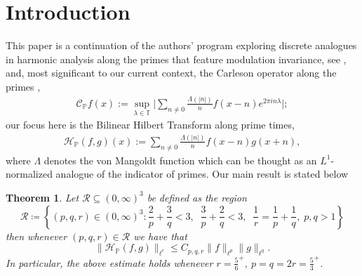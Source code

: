 \documentclass[12pt,leqno]{amsart}
\numberwithin{equation}{section}
\newtheorem{theorem}[equation]{Theorem}
\theoremstyle{definition}
\theoremstyle{plain}
\begin{document}
	\maketitle
	
	\setcounter{footnote}{0} %
	
	
	\setcounter{tocdepth}{1}
	
	\section{Introduction}
	
	This paper is a continuation of the authors' program exploring discrete analogues in harmonic analysis along the primes that feature modulation invariance, see \cite{F+,FKT1}, and, most significant to our current context, the Carleson operator along the primes \cite{FKMS26},
	\begin{align}
		\mathcal{C}_{\mathbb{P}}f(x) := \sup_{\lambda \in \mathbb{T}} \big| \sum_{n \neq 0} \frac{\Lambda(|n|)}{n} f(x-n) e^{2 \pi i n \lambda} \big|;
	\end{align}
	our focus here is the Bilinear Hilbert Transform along prime times,
	\begin{align}\label{e:BHTdef}
		\mathcal{H}_{\mathbb{P}}(f,g)(x) := \sum_{n \neq 0} \frac{\Lambda(|n|)}{n} f(x-n) g(x+n),
	\end{align}
	where $\Lambda$ denotes the von Mangoldt function which can be thought as an $L^1$-normalized analogue of the indicator of primes. Our main result is stated below
	\begin{theorem} \label{t:maintheorem}
		Let $\mathcal{R} \subseteq (0,\infty)^{3}$ be defined as the region  \[  \mathcal{R} \coloneqq  \left\{ (p,q,r) \in (0,\infty)^3: \frac{2}{p}+\frac{3}{q}<3,\; \; \frac{3}{p}+\frac{2}{q}<3, \;\; \frac{1}{r}=\frac{1}{p}+\frac{1}{q}, \; p,q>1  \right\} \] then whenever $(p,q,r) \in \mathcal{R}$ we have that
		\[ \| \mathcal{H}_{\mathbb{P}}(f,g) \|_{\ell^r} \leq C_{p,q,r} \|f \|_{\ell^p} \| g \|_{\ell^q}.\]
		In particular, the above estimate holds whenever $r = \frac{5}{6}^+, \ p = q = 2r = \frac{5}{3}^+$.
	\end{theorem}
\end{document}
